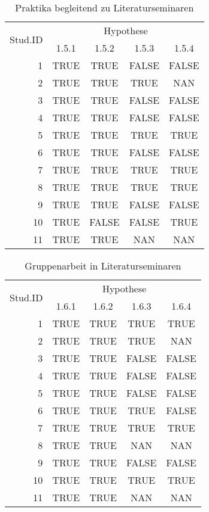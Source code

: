 \begin{table}[h!]
\caption{Praktika begleitend zu Literaturseminaren}
\label{tab:5}
\begin{center}
\begin{tabular}{|r|c|c|c|c|}
\hline
\multirow{2}{2cm}{Stud.ID} & \multicolumn{4}{|c|}{Hypothese}\\
 & 1.5.1 & 1.5.2 & 1.5.3 & 1.5.4\\
\hline
1 & TRUE & TRUE & FALSE & FALSE\\
2 & TRUE & TRUE & TRUE & NAN\\
3 & TRUE & TRUE & FALSE & FALSE\\
4 & TRUE & TRUE & FALSE & FALSE\\
5 & TRUE & TRUE & TRUE & TRUE\\
6 & TRUE & TRUE & FALSE & FALSE\\
7 & TRUE & TRUE & TRUE & TRUE\\
8 & TRUE & TRUE & TRUE & TRUE\\
9 & TRUE & TRUE & FALSE & FALSE\\
10 & TRUE & FALSE & FALSE & TRUE\\
11 & TRUE & TRUE & NAN & NAN\\
\hline
\end{tabular}
\end{center}
\end{table}

\begin{table}[h!]
\caption{Gruppenarbeit in Literaturseminaren}
\label{tab:6}
\begin{center}
\begin{tabular}{|r|c|c|c|c|}
\hline
\multirow{2}{2cm}{Stud.ID} & \multicolumn{4}{|c|}{Hypothese}\\
 & 1.6.1 & 1.6.2 & 1.6.3 & 1.6.4\\
\hline
1 & TRUE & TRUE & TRUE & TRUE\\
2 & TRUE & TRUE & TRUE & NAN\\
3 & TRUE & TRUE & FALSE & FALSE\\
4 & TRUE & TRUE & FALSE & FALSE\\
5 & TRUE & TRUE & FALSE & FALSE\\
6 & TRUE & TRUE & TRUE & FALSE\\
7 & TRUE & TRUE & TRUE & TRUE\\
8 & TRUE & TRUE & NAN & NAN\\
9 & TRUE & TRUE & FALSE & FALSE\\
10 & TRUE & TRUE & TRUE & TRUE\\
11 & TRUE & TRUE & NAN & NAN\\
\hline
\end{tabular}
\end{center}
\end{table}

